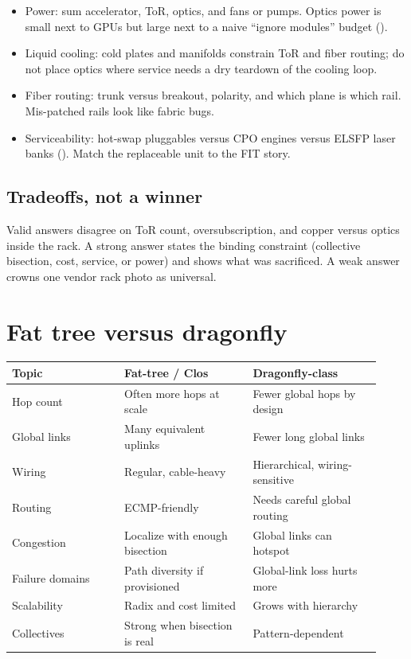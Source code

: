 \begin{itemize}
\item Power: sum accelerator, ToR, optics, and fans or pumps. Optics power is
      small next to GPUs but large next to a naive ``ignore modules'' budget
      ().
\item Liquid cooling: cold plates and manifolds constrain ToR and fiber
      routing; do not place optics where service needs a dry teardown of the
      cooling loop.
\item Fiber routing: trunk versus breakout, polarity, and which plane is which
      rail. Mis-patched rails look like fabric bugs.
\item Serviceability: hot-swap pluggables versus CPO engines versus ELSFP laser
      banks (). Match the replaceable unit to the
      FIT story.
\end{itemize}

\subsection{Tradeoffs, not a winner}
\label{sec:hpc-rack-tradeoffs}

Valid answers disagree on ToR count, oversubscription, and copper versus optics
inside the rack. A strong answer states the binding constraint (collective
bisection, cost, service, or power) and shows what was sacrificed. A weak
answer crowns one vendor rack photo as universal.

\section{Fat tree versus dragonfly}
\label{sec:hpc-dragonfly}

\begin{center}
\footnotesize
\begin{tabular}{@{}p{0.28\linewidth}p{0.32\linewidth}p{0.32\linewidth}@{}}
\toprule
Topic & Fat-tree / Clos & Dragonfly-class \\
\midrule
Hop count & Often more hops at scale & Fewer global hops by design \\
Global links & Many equivalent uplinks & Fewer long global links \\
Wiring & Regular, cable-heavy & Hierarchical, wiring-sensitive \\
Routing & ECMP-friendly & Needs careful global routing \\
Congestion & Localize with enough bisection & Global links can hotspot \\
Failure domains & Path diversity if provisioned & Global-link loss hurts more \\
Scalability & Radix and cost limited & Grows with hierarchy \\
Collectives & Strong when bisection is real & Pattern-dependent \\
\bottomrule
\end{tabular}
\end{center}

